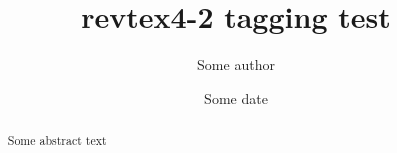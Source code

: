 \documentclass[aps,pra]{revtex4-2}
\begin{document}
\title{revtex4-2 tagging test}
\author{Some author}

\date{Some date}

\begin{abstract}
Some abstract text
\end{abstract}

\maketitle

\blinddocument
\end{document}
